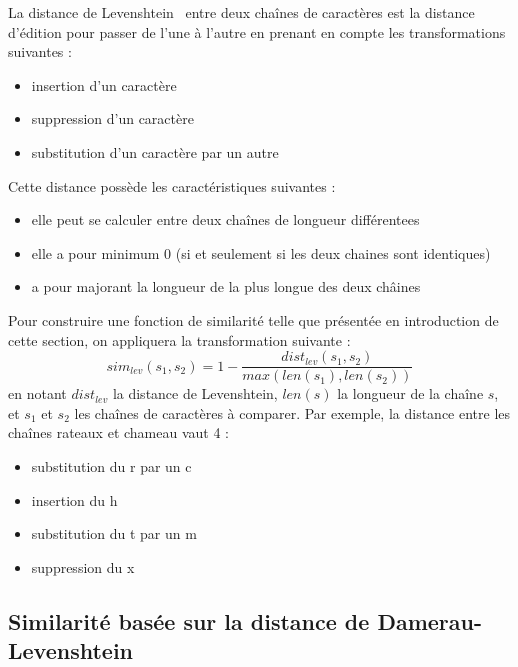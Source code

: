             La distance de Levenshtein~\cite{levenshtein_wiki}  entre deux chaînes de caractères est la distance d'édition pour passer de l'une à l'autre en prenant en compte les transformations suivantes :
            \begin{itemize}
                \item insertion d'un caractère 
                \item suppression d'un caractère
                \item substitution d'un caractère par un autre
            \end{itemize}
            Cette distance possède les caractéristiques suivantes : 
            \begin{itemize}
                \item elle peut se calculer entre deux chaînes de longueur différentees
                \item elle a pour minimum 0 (si et seulement si les deux chaines sont identiques)
                \item a pour majorant la longueur de la plus longue des deux châines
            \end{itemize}
            Pour construire une fonction de similarité telle que présentée en introduction de cette section, on appliquera la transformation suivante : 
            \[sim_{lev}(s_{1}, s_{2}) = 1 - \frac{dist_{lev}(s_{1}, s_{2})}{max(len(s_{1}), len(s_{2}))}\]
            en notant $dist_{lev}$ la distance de Levenshtein, $len(s)$ la longueur de la chaîne $s$, et $s_{1}$ et $s_{2}$ les chaînes de caractères à comparer.
            Par exemple, la distance entre les chaînes \og rateaux \fg et \og chameau \fg vaut 4 :
            \begin{itemize}
                \item substitution du \og r \fg par un \og c \fg
                \item insertion du \og h \fg
                \item substitution du \og t \fg par un \og m \fg
                \item suppression du \og x \fg
            \end{itemize}

            \subsection{Similarité basée sur la distance de Damerau-Levenshtein}

